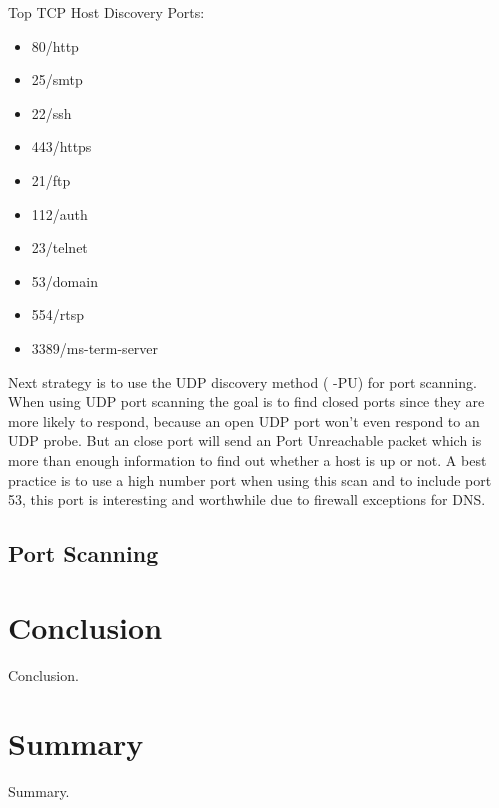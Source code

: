 \documentclass[times, utf8, seminar,english]{fer}
\begin{document}
\newline Top TCP Host Discovery Ports:
\begin{itemize}
	\item 80/http
	\item 25/smtp
	\item 22/ssh
	\item 443/https
	\item 21/ftp
	\item 112/auth
	\item 23/telnet
	\item 53/domain
	\item 554/rtsp
	\item 3389/ms-term-server
\end{itemize}

Next strategy is to use the UDP discovery method ( -PU) for port scanning. When using UDP port scanning the goal is to find closed ports since they are more likely to respond, because an open UDP port won't even respond to an UDP probe. But an close port will send an Port Unreachable packet which is more than enough information to find out whether a host is up or not. A best practice is to use a high number port when using this scan and to include port 53, this port is interesting and worthwhile due to firewall exceptions for DNS.
\newpage\section{Port Scanning}

\chapter{Conclusion}
Conclusion.




\chapter{Summary}
Summary.
\end{document}
